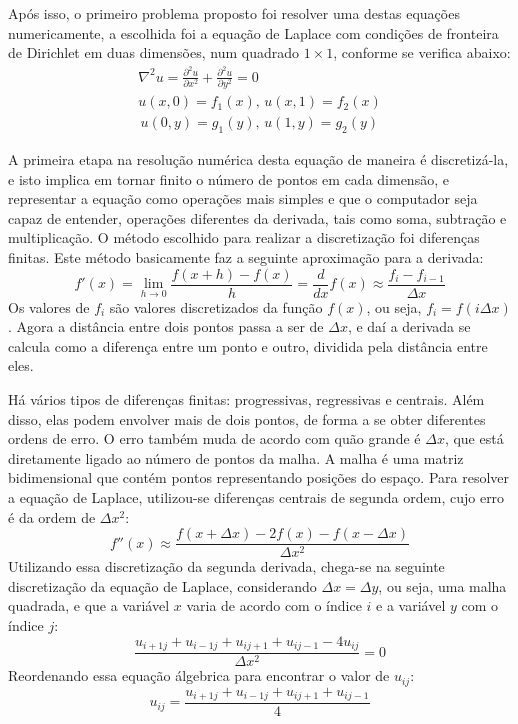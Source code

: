 \documentclass[journal]{IEEEtran}
\begin{document}
Após isso, o primeiro problema proposto foi resolver uma destas equações numericamente, a escolhida foi a equação de Laplace com condições de fronteira de Dirichlet em duas dimensões, num quadrado $1\times 1$, conforme se verifica abaixo:
\begin{eqnarray}
\nabla^2 u=\frac{\partial^2 u}{\partial x^2}+\frac{\partial^2 u}{\partial y^2}=0\label{laplace}\\
u(x,0)=f_1(x),\,u(x,1)=f_2(x)\nonumber \\
\,u(0,y)=g_1(y),\,u(1,y)=g_2(y) \nonumber
\end{eqnarray}

A primeira etapa na resolução numérica desta equação de maneira é discretizá-la, e isto implica em tornar finito o número de pontos em cada dimensão, e representar a equação como operações mais simples e que o computador seja capaz de entender, operações diferentes da derivada, tais como soma, subtração e multiplicação. O método escolhido para realizar a discretização foi diferenças finitas. Este método basicamente faz a seguinte aproximação para a derivada:
\begin{equation}
f'(x)=\lim_{h\rightarrow 0}\frac{f(x+h)-f(x)}{h}=\frac{d}{dx}f(x)\approx \frac{f_i-f_{i-1}}{\Delta x}
\end{equation}
Os valores de $f_i$ são valores discretizados da função $f(x)$, ou seja, $f_i=f(i\Delta x)$. Agora a distância entre dois pontos passa a ser de $\Delta x$, e daí a derivada se calcula como a diferença entre um ponto e outro, dividida pela distância entre eles. 

Há vários tipos de diferenças finitas: progressivas, regressivas e centrais. Além disso, elas podem envolver mais de dois pontos, de forma a se obter diferentes ordens de erro. O erro também muda de acordo com quão grande é $\Delta x$, que está diretamente ligado ao número de pontos da malha. A malha é uma matriz bidimensional que contém pontos representando posições do espaço. Para resolver a equação de Laplace, utilizou-se diferenças centrais de segunda ordem, cujo erro é da ordem de $\Delta x^2$:
\begin{equation}
f''(x)\approx \frac{f(x+\Delta x)-2f(x)-f(x-\Delta x)}{\Delta x^2}
\end{equation}
Utilizando essa discretização da segunda derivada, chega-se na seguinte discretização da equação de Laplace, considerando $\Delta x=\Delta y$, ou seja, uma malha quadrada, e que a variável $x$ varia de acordo com o índice $i$ e a variável $y$ com o índice $j$:
\begin{equation}
\frac{u_{i+1j}+u_{i-1j}+u_{ij+1}+u_{ij-1}-4u_{ij}}{\Delta x^2}=0 \label{laplace_discreta_zero}
\end{equation}
Reordenando essa equação álgebrica para encontrar o valor de $u_{ij}$:
\begin{equation}
  u_{ij}=\frac{u_{i+1j}+u_{i-1j}+u_{ij+1}+u_{ij-1}}{4} \label{laplace_discreta}
\end{equation}
\end{document}
